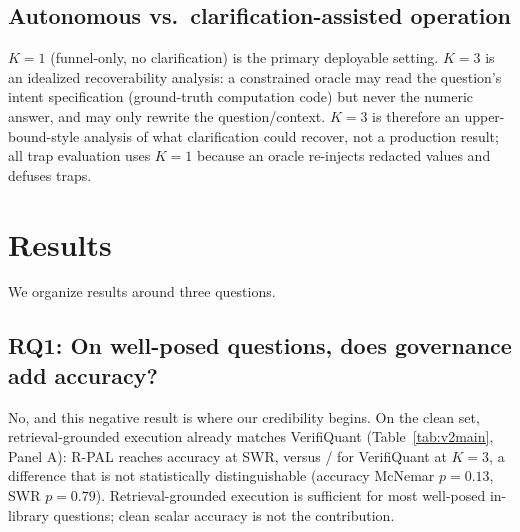 \subsection{Autonomous vs.\ clarification-assisted operation}
$K{=}1$ (funnel-only, no clarification) is the primary deployable setting.
$K{=}3$ is an idealized recoverability analysis: a constrained oracle may read the question's intent specification (ground-truth computation code) but never the numeric answer, and may only rewrite the question/context.
$K{=}3$ is therefore an upper-bound-style analysis of what clarification could recover, not a production result; all trap evaluation uses $K{=}1$ because an oracle re-injects redacted values and defuses traps.

\section{Results}\label{sec:v2res}
We organize results around three questions.

\subsection*{RQ1: On well-posed questions, does governance add accuracy?}
No, and this negative result is where our credibility begins.
On the clean set, retrieval-grounded execution already matches VerifiQuant (Table~\ref{tab:v2main}, Panel A): R-PAL reaches \rpalAccAll{} accuracy at \rpalSWRAll{} SWR, versus \vqAccAll{}/\vqSWRAll{} for VerifiQuant at $K{=}3$, a difference that is not statistically distinguishable (accuracy McNemar $p{=}0.13$, SWR $p{=}0.79$).
Retrieval-grounded execution is sufficient for most well-posed in-library questions; clean scalar accuracy is not the contribution.


